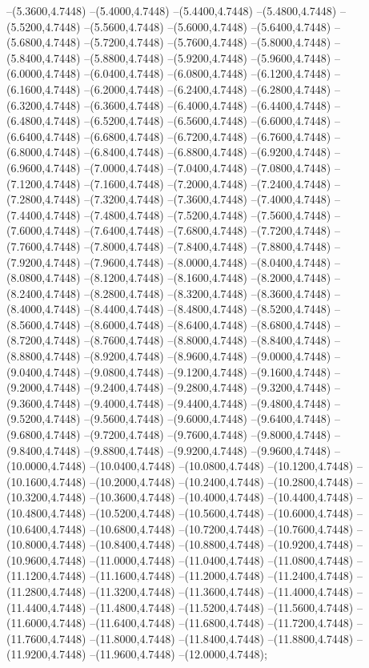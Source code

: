 {	--(5.3600,4.7448)
	--(5.4000,4.7448)
	--(5.4400,4.7448)
	--(5.4800,4.7448)
	--(5.5200,4.7448)
	--(5.5600,4.7448)
	--(5.6000,4.7448)
	--(5.6400,4.7448)
	--(5.6800,4.7448)
	--(5.7200,4.7448)
	--(5.7600,4.7448)
	--(5.8000,4.7448)
	--(5.8400,4.7448)
	--(5.8800,4.7448)
	--(5.9200,4.7448)
	--(5.9600,4.7448)
	--(6.0000,4.7448)
	--(6.0400,4.7448)
	--(6.0800,4.7448)
	--(6.1200,4.7448)
	--(6.1600,4.7448)
	--(6.2000,4.7448)
	--(6.2400,4.7448)
	--(6.2800,4.7448)
	--(6.3200,4.7448)
	--(6.3600,4.7448)
	--(6.4000,4.7448)
	--(6.4400,4.7448)
	--(6.4800,4.7448)
	--(6.5200,4.7448)
	--(6.5600,4.7448)
	--(6.6000,4.7448)
	--(6.6400,4.7448)
	--(6.6800,4.7448)
	--(6.7200,4.7448)
	--(6.7600,4.7448)
	--(6.8000,4.7448)
	--(6.8400,4.7448)
	--(6.8800,4.7448)
	--(6.9200,4.7448)
	--(6.9600,4.7448)
	--(7.0000,4.7448)
	--(7.0400,4.7448)
	--(7.0800,4.7448)
	--(7.1200,4.7448)
	--(7.1600,4.7448)
	--(7.2000,4.7448)
	--(7.2400,4.7448)
	--(7.2800,4.7448)
	--(7.3200,4.7448)
	--(7.3600,4.7448)
	--(7.4000,4.7448)
	--(7.4400,4.7448)
	--(7.4800,4.7448)
	--(7.5200,4.7448)
	--(7.5600,4.7448)
	--(7.6000,4.7448)
	--(7.6400,4.7448)
	--(7.6800,4.7448)
	--(7.7200,4.7448)
	--(7.7600,4.7448)
	--(7.8000,4.7448)
	--(7.8400,4.7448)
	--(7.8800,4.7448)
	--(7.9200,4.7448)
	--(7.9600,4.7448)
	--(8.0000,4.7448)
	--(8.0400,4.7448)
	--(8.0800,4.7448)
	--(8.1200,4.7448)
	--(8.1600,4.7448)
	--(8.2000,4.7448)
	--(8.2400,4.7448)
	--(8.2800,4.7448)
	--(8.3200,4.7448)
	--(8.3600,4.7448)
	--(8.4000,4.7448)
	--(8.4400,4.7448)
	--(8.4800,4.7448)
	--(8.5200,4.7448)
	--(8.5600,4.7448)
	--(8.6000,4.7448)
	--(8.6400,4.7448)
	--(8.6800,4.7448)
	--(8.7200,4.7448)
	--(8.7600,4.7448)
	--(8.8000,4.7448)
	--(8.8400,4.7448)
	--(8.8800,4.7448)
	--(8.9200,4.7448)
	--(8.9600,4.7448)
	--(9.0000,4.7448)
	--(9.0400,4.7448)
	--(9.0800,4.7448)
	--(9.1200,4.7448)
	--(9.1600,4.7448)
	--(9.2000,4.7448)
	--(9.2400,4.7448)
	--(9.2800,4.7448)
	--(9.3200,4.7448)
	--(9.3600,4.7448)
	--(9.4000,4.7448)
	--(9.4400,4.7448)
	--(9.4800,4.7448)
	--(9.5200,4.7448)
	--(9.5600,4.7448)
	--(9.6000,4.7448)
	--(9.6400,4.7448)
	--(9.6800,4.7448)
	--(9.7200,4.7448)
	--(9.7600,4.7448)
	--(9.8000,4.7448)
	--(9.8400,4.7448)
	--(9.8800,4.7448)
	--(9.9200,4.7448)
	--(9.9600,4.7448)
	--(10.0000,4.7448)
	--(10.0400,4.7448)
	--(10.0800,4.7448)
	--(10.1200,4.7448)
	--(10.1600,4.7448)
	--(10.2000,4.7448)
	--(10.2400,4.7448)
	--(10.2800,4.7448)
	--(10.3200,4.7448)
	--(10.3600,4.7448)
	--(10.4000,4.7448)
	--(10.4400,4.7448)
	--(10.4800,4.7448)
	--(10.5200,4.7448)
	--(10.5600,4.7448)
	--(10.6000,4.7448)
	--(10.6400,4.7448)
	--(10.6800,4.7448)
	--(10.7200,4.7448)
	--(10.7600,4.7448)
	--(10.8000,4.7448)
	--(10.8400,4.7448)
	--(10.8800,4.7448)
	--(10.9200,4.7448)
	--(10.9600,4.7448)
	--(11.0000,4.7448)
	--(11.0400,4.7448)
	--(11.0800,4.7448)
	--(11.1200,4.7448)
	--(11.1600,4.7448)
	--(11.2000,4.7448)
	--(11.2400,4.7448)
	--(11.2800,4.7448)
	--(11.3200,4.7448)
	--(11.3600,4.7448)
	--(11.4000,4.7448)
	--(11.4400,4.7448)
	--(11.4800,4.7448)
	--(11.5200,4.7448)
	--(11.5600,4.7448)
	--(11.6000,4.7448)
	--(11.6400,4.7448)
	--(11.6800,4.7448)
	--(11.7200,4.7448)
	--(11.7600,4.7448)
	--(11.8000,4.7448)
	--(11.8400,4.7448)
	--(11.8800,4.7448)
	--(11.9200,4.7448)
	--(11.9600,4.7448)
	--(12.0000,4.7448);
}
\def\allca{
\lockdownca \Sca \Rca \Ica
\draw[color=red,line width=0.5pt] (0,1.0000)--(12,1.0000);
\node[color=red] at (0,1.0000) [above right] {$I_0=0.200$};
\node at (3,5.3) [above] {$\beta = 0.60$};
\node at (9,5.3) [above] {$\gamma = 0.20$};
}
